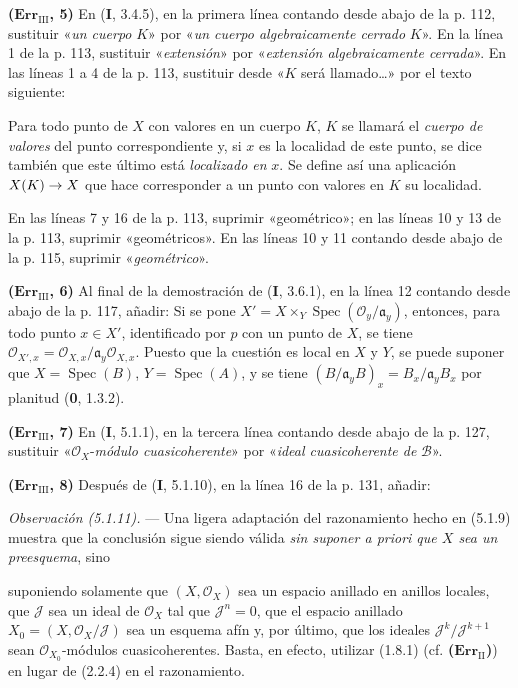 \documentclass[10pt,oneside,openany]{book}
\theoremstyle{egaenv}\newtheorem*{env}{---}
\theoremstyle{egastatement}
\theoremstyle{egadescription}
\newcommand{\oldpage}[2][]{\marginnote{\normalfont\scriptsize\textbf{#1}\,|\,#2}\ignorespaces}
\renewcommand{\to}{\mathchoice{\longrightarrow}{\rightarrow}{\rightarrow}{\rightarrow}}
\begin{document}
\noindent\textbf{($\mathbf{Err}_{\mathrm{III}}$, 5)} En (\textbf I, 3.4.5), en la
primera línea contando desde abajo de la p. 112, sustituir «\emph{un cuerpo}
$K$» por «\emph{un cuerpo algebraicamente cerrado} $K$». En la línea 1 de la
p. 113, sustituir «\emph{extensión}» por «\emph{extensión algebraicamente
cerrada}». En las líneas 1 a 4 de la p. 113, sustituir desde «$K$ será
llamado\ldots{}» por el texto siguiente:

Para todo punto de $X$ con valores en un cuerpo $K$, $K$ se llamará el
\emph{cuerpo de valores} del punto correspondiente y, si $x$ es la localidad
de este punto, se dice también que este último está \emph{localizado en} $x$.
Se define así una aplicación $X(K)\to X$ que hace corresponder a un punto con
valores en $K$ su localidad.

En las líneas 7 y 16 de la p. 113, suprimir «geométrico»; en las líneas 10 y 13
de la p. 113, suprimir «geométricos». En las líneas 10 y 11 contando desde
abajo de la p. 115, suprimir «\emph{geométrico}».

\noindent\textbf{($\mathbf{Err}_{\mathrm{III}}$, 6)} Al final de la
demostración de (\textbf I, 3.6.1), en la línea 12 contando desde abajo de la p. 117,
añadir: Si se pone
$X'=X\times_Y\operatorname{Spec}(\mathscr O_y/\mathfrak a_y)$, entonces, para
todo punto $x\in X'$, identificado por $p$ con un punto de $X$, se tiene
$\mathscr O_{X',x}=\mathscr O_{X,x}/\mathfrak a_y\mathscr O_{X,x}$. Puesto que
la cuestión es local en $X$ y $Y$, se puede suponer que
$X=\operatorname{Spec}(B)$, $Y=\operatorname{Spec}(A)$, y se tiene
$(B/\mathfrak a_yB)_x=B_x/\mathfrak a_yB_x$ por planitud (\textbf{0}, 1.3.2).

\noindent\textbf{($\mathbf{Err}_{\mathrm{III}}$, 7)} En (\textbf I, 5.1.1), en la
tercera línea contando desde abajo de la p. 127, sustituir
«$\mathscr O_X$-\emph{módulo cuasicoherente}» por «\emph{ideal cuasicoherente de}
$\mathscr B$».

\noindent\textbf{($\mathbf{Err}_{\mathrm{III}}$, 8)} Después de (\textbf I, 5.1.10),
en la línea 16 de la p. 131, añadir:

\emph{Observación (5.1.11).} --- Una ligera adaptación del razonamiento hecho
en (5.1.9) muestra que la conclusión sigue siendo válida \emph{sin suponer a
priori que $X$ sea un preesquema}, sino

\oldpage[III]{220}
suponiendo solamente que $(X,\mathscr O_X)$ sea un espacio anillado en anillos
locales, que $\mathscr J$ sea un ideal de $\mathscr O_X$ tal que
$\mathscr J^n=0$, que el espacio anillado
$X_0=(X,\mathscr O_X/\mathscr J)$ sea un esquema afín y, por último, que los
ideales $\mathscr J^k/\mathscr J^{k+1}$ sean $\mathscr O_{X_0}$-módulos
cuasicoherentes. Basta, en efecto, utilizar (1.8.1) (cf.
\textbf{($\mathbf{Err}_{\mathrm{II}}$)}) en lugar de (2.2.4) en el razonamiento.
\end{document}
